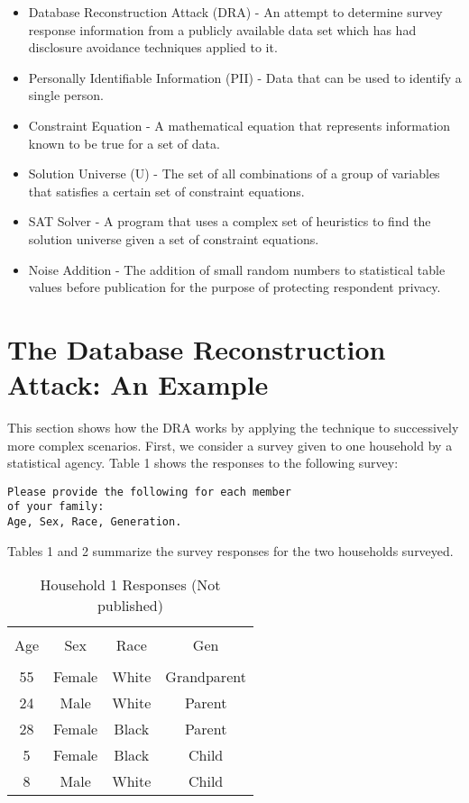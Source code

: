 \documentclass[jou,apacite]{apa6}
\begin{document}
\begin{itemize}
\item Database Reconstruction Attack (DRA) - An attempt to determine survey response information from a publicly available data set which has had disclosure avoidance techniques applied to it.

\item Personally Identifiable Information (PII) - Data that can be used to identify a single person.

\item Constraint Equation - A mathematical equation that represents information known to be true for a set of data.

\item Solution Universe (U) - The set of all combinations of a
group of variables that satisfies a certain set of constraint equations.

\item SAT Solver - A program that uses a complex set of heuristics to find the solution universe given a set of constraint equations.

\item Noise Addition - The addition of small random numbers to statistical table values before publication for the purpose of protecting respondent privacy.
\end{itemize}

\section{The Database Reconstruction Attack: An Example}
This section shows how the DRA works by applying the technique to successively more complex scenarios. First, we consider a survey given to one household by a statistical agency. Table 1 shows the responses to the following survey:
\begin{verbatim}
Please provide the following for each member
of your family:
Age, Sex, Race, Generation.
\end{verbatim}
Tables 1 and 2 summarize the survey responses for the two households surveyed.
\begin{table}[!htb]
\caption{Household 1 Responses (Not published)}\label{tab1}
\begin{tabular}{cccc}
\hline\\[-1.5ex]
Age & Sex & Race & Gen \\[0.5ex]
\hline\\[-1.5ex]
55 & Female & White & Grandparent\\[0.5ex]
24 & Male & White & Parent\\[0.5ex]
28 & Female & Black & Parent\\[0.5ex]
5 & Female & Black & Child\\[0.5ex]
8 & Male & White & Child\\[0.5ex]
\hline
\end{tabular}
\end{table}
\end{document}
